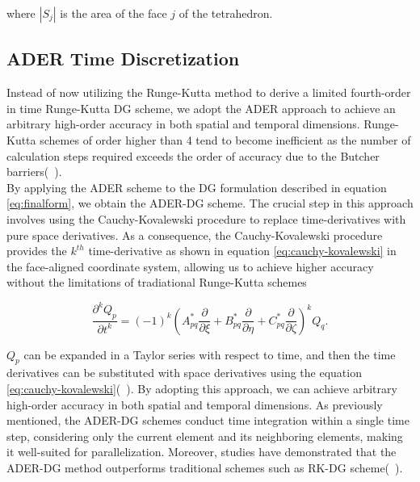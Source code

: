 where $\left|S_j\right|$ is the area of the face $j$ of the tetrahedron.

\subsection[ADER Time Discretization]{ADER Time Discretization}

Instead of now utilizing the Runge-Kutta method to derive a limited fourth-order in time Runge-Kutta \ac{DG} scheme, we adopt the 
\ac{ADER} approach to achieve an arbitrary high-order accuracy in both spatial and temporal dimensions. Runge-Kutta schemes of order
higher than 4 tend to become inefficient as the number of calculation steps required exceeds the order of accuracy due to the Butcher barriers(~\parencite{butcher1987numerical}). \\

By applying the \ac{ADER} scheme to the \ac{DG} formulation described in equation \ref{eq:finalform}, we obtain the \ac{ADER}-\ac{DG} scheme.
The crucial step in this approach involves using the Cauchy-Kovalewski procedure to replace time-derivatives with pure space derivatives.
As a consequence, the Cauchy-Kovalewski procedure provides the $k^{th}$ time-derivative as shown in equation \ref{eq:cauchy-kovalewski} in the face-aligned coordinate system, allowing us to
achieve higher accuracy without the limitations of tradiational Runge-Kutta schemes

\begin{equation}
    \frac{\partial^k Q_p}{\partial t^k} = \left(-1\right)^k \left(A_{pq}^* \frac{\partial}{\partial \xi} + B_{pq}^* \frac{\partial}{\partial \eta} + C_{pq}^* \frac{\partial}{\partial \zeta}\right)^k Q_q .
    \label{eq:cauchy-kovalewski}
\end{equation}

$Q_p$ can be expanded in a Taylor series with respect to time, and then the time derivatives can be substituted with space derivatives
using the equation \ref{eq:cauchy-kovalewski}(~\parencite[Sec. 3.2]{dumbser1}). By adopting this approach, we can achieve arbitrary high-order
accuracy in both spatial and temporal dimensions. As previously mentioned, the \ac{ADER}-\ac{DG} schemes conduct time integration
within a single time step, considering only the current element and its neighboring elements, making it well-suited for parallelization.
Moreover, studies have demonstrated that the \ac{ADER}-\ac{DG} method outperforms traditional schemes such as \ac{RK-DG} scheme(~\parencite{dumbser2005ader}).

